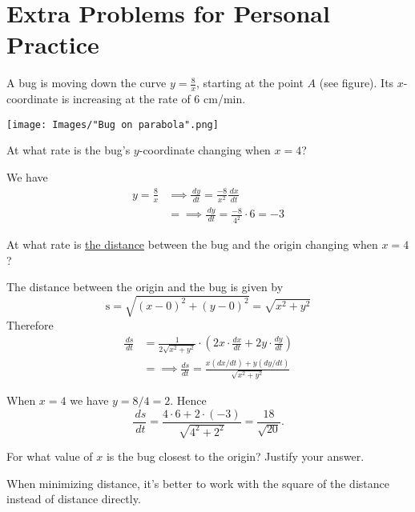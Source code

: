 \documentclass[nooutcomes]{ximera}
\renewenvironment{freeResponse}{
\ifhandout\setbox0\vbox\bgroup\else
\begin{trivlist}\item[\hskip \labelsep\bfseries Solution:\hspace{2ex}]
\fi}
{\ifhandout\egroup\else
\end{trivlist}
\fi}
\renewcommand{\d}{\,d}
\begin{document}
\section{Extra Problems for Personal Practice}
\begin{problem}
  A bug is moving down the curve $y = \frac{8}{x}$, starting at the point $A$ (see figure).
  Its $x$-coordinate is increasing at the rate of 6 cm/min.
  \begin{image}
    \texttt{[image: Images/"Bug on parabola".png]}
  \end{image}
  \begin{itemize}
    \item[(i)]
      At what rate is the bug's $y$-coordinate changing when $x = 4$?
      \begin{freeResponse}
        We have
        \begin{align*}
          y = \frac{8}{x} &\implies \frac{\d y}{\d t} = \frac{-8}{x^2} \frac{\d x}{\d t} \\
          &= \implies \frac{\d y}{\d t} = \frac{-8}{4^2} \cdot 6 = -3
        \end{align*}
      \end{freeResponse}

    \item[(ii)]
      At what rate is \underline{the distance} between the bug and the origin changing when $x = 4$?
      \begin{freeResponse}
        The distance between the origin and the bug is given by
        \[
          \text{s} = \sqrt{(x- 0)^2 + (y - 0)^2} = \sqrt{x^2 + y^2}
        \]
        Therefore
        \begin{align*}
          \frac{\d s}{\d t} &= \frac{1}{2\sqrt{x^2+y^2}}\cdot \left(2 x \cdot \frac{dx}{dt} + 2y \cdot\frac{dy}{dt}\right) \\
          &= \implies \frac{ds}{dt} = \frac{x (dx/dt) + y (dy/dt)}{\sqrt{x^2+y^2}}
        \end{align*}

        When $x = 4$ we have $y = 8/4 = 2$.
        Hence
        \[
          \frac{\d s}{\d t} = \frac{4 \cdot 6 + 2 \cdot (-3)}{\sqrt{4^2 + 2^2}} = \frac{18}{\sqrt{20}}.
        \]
      \end{freeResponse}

    \item[(iii)]
      For what value of $x$ is the bug closest to the origin?
      Justify your answer.
      \begin{freeResponse}
        When minimizing distance, it's better to work with the square of the distance instead of distance directly.


\end{freeResponse}
\end{itemize}
\end{problem}
\end{document}
